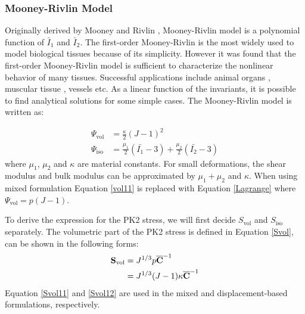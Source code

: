 \subsubsection{Mooney-Rivlin Model}
Originally derived by Mooney \cite{Mooney} and Rivlin \cite{Rivlin}, Mooney-Rivlin model is a polynomial function of $\bar{I}_1$ and $\bar{I}_2$. The first-order Mooney-Rivlin is the most widely used to model biological tissues because of its simplicity. However it was found that the first-order Mooney-Rivlin model is sufficient to characterize the nonlinear behavior of many tissues. Successful applications include animal organs \cite{Wall}, muscular tissue \cite{Bols2}, vessels \cite{Navidbakhsh} etc. As a linear function of the invariants, it is possible to find analytical solutions for some simple cases. The Mooney-Rivlin model is written as:

\begin{subequations}
\label{Mooney}
\begin{align}
\Psi_\mathrm{vol} &= \frac{\kappa}{2}(J - 1)^2 \label{vol11} \\
\Psi_\mathrm{iso} &= \frac{\mu_1}{2}(\bar{I_1} - 3) + \frac{\mu_2}{2}(\bar{I_2} - 3) \label{iso1}
\end{align}
\end{subequations}
where $\mu_1$, $\mu_2$ and $\kappa$ are material constants. For small deformations, the shear modulus and bulk modulus can be approximated by $\mu_1+\mu_2$ and $\kappa$. When using mixed formulation Equation \ref{vol11} is replaced with Equation \ref{Lagrange} where $\Psi_\mathrm{vol} = p(J - 1) $.

To derive the expression for the PK2 stress, we will first decide $S_\mathrm{vol}$ and $S_\mathrm{iso}$ separately. The volumetric part of the PK2 stress is defined in Equation \ref{Svol}, can be shown in the following forms:
\begin{subequations}
\label{Svol1}
\begin{align}
\bold{S}_\mathrm{vol} &= J^{1/3}p{\overline{\bold{C}}}^{-1} \label{Svol11}\\
		      &= {J^{1/3}(J-1)}\kappa {\overline{\bold{C}}}^{-1} \label{Svol12}
\end{align}
\end{subequations}
Equation \ref{Svol11} and \ref{Svol12} are used in the mixed and displacement-based formulations, respectively.

